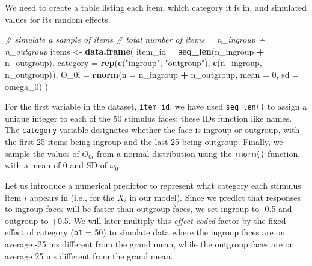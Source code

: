 \documentclass[english,doc,floatsintext]{apa6}
\newenvironment{Shaded}{\begin{snugshade}}{\end{snugshade}}
\newcommand{\CommentTok}[1]{\textcolor[rgb]{0.56,0.35,0.01}{\textit{#1}}}
\newcommand{\DataTypeTok}[1]{\textcolor[rgb]{0.13,0.29,0.53}{#1}}
\newcommand{\DecValTok}[1]{\textcolor[rgb]{0.00,0.00,0.81}{#1}}
\newcommand{\FloatTok}[1]{\textcolor[rgb]{0.00,0.00,0.81}{#1}}
\newcommand{\KeywordTok}[1]{\textcolor[rgb]{0.13,0.29,0.53}{\textbf{#1}}}
\newcommand{\NormalTok}[1]{#1}
\newcommand{\OperatorTok}[1]{\textcolor[rgb]{0.81,0.36,0.00}{\textbf{#1}}}
\newcommand{\StringTok}[1]{\textcolor[rgb]{0.31,0.60,0.02}{#1}}
\begin{document}
We need to create a table listing each item, which category it is in, and simulated values for its random effects.

\begin{Shaded}
\begin{Highlighting}[]
\CommentTok{# simulate a sample of items}
\CommentTok{# total number of items = n_ingroup + n_outgroup}
\NormalTok{items <-}\StringTok{ }\KeywordTok{data.frame}\NormalTok{(}
  \DataTypeTok{item_id =} \KeywordTok{seq_len}\NormalTok{(n_ingroup }\OperatorTok{+}\StringTok{ }\NormalTok{n_outgroup),}
  \DataTypeTok{category =} \KeywordTok{rep}\NormalTok{(}\KeywordTok{c}\NormalTok{(}\StringTok{"ingroup"}\NormalTok{, }\StringTok{"outgroup"}\NormalTok{), }\KeywordTok{c}\NormalTok{(n_ingroup, n_outgroup)),}
  \DataTypeTok{O_0i =} \KeywordTok{rnorm}\NormalTok{(}\DataTypeTok{n =}\NormalTok{ n_ingroup }\OperatorTok{+}\StringTok{ }\NormalTok{n_outgroup, }\DataTypeTok{mean =} \DecValTok{0}\NormalTok{, }\DataTypeTok{sd =}\NormalTok{ omega_}\DecValTok{0}\NormalTok{)}
\NormalTok{)}
\end{Highlighting}
\end{Shaded}

For the first variable in the dataset, \texttt{item\_id}, we have used \texttt{seq\_len()} to assign a unique integer to each of the 50 stimulus faces; these IDs function like names. The \texttt{category} variable designates whether the face is ingroup or outgroup, with the first 25 items being ingroup and the last 25 being outgroup. Finally, we sample the values of \(O_{0i}\) from a normal distribution using the \texttt{rnorm()} function, with a mean of 0 and SD of \(\omega_0\).

Let us introduce a numerical predictor to represent what category each stimulus item \(i\) appears in (i.e., for the \(X_i\) in our model). Since we predict that responses to ingroup faces will be faster than outgroup faces, we set ingroup to -0.5 and outgroup to +0.5. We will later multiply this \emph{effect coded} factor by the fixed effect of category (\texttt{b1} = 50) to simulate data where the ingroup faces are on average -25 ms different from the grand mean, while the outgroup faces are on average 25 ms different from the grand mean.

\begin{Shaded}
\end{Shaded}
\end{document}
